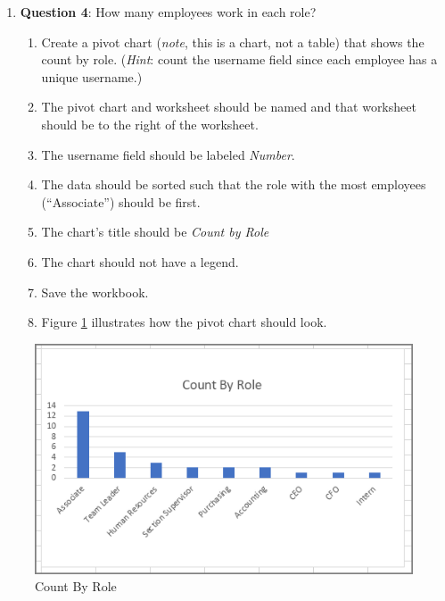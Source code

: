 \begin{enumerate}[resume]
	\item{\textbf{Question 4}: How many employees work in each role?}
	
	\begin{enumerate}
		\item Create a pivot chart (\textit{note}, this is a chart, not a table) that shows the count by role. (\textit{Hint}: count the username field since each employee has a unique username.)
		\item The pivot chart and worksheet should be named  and that worksheet should be to the right of the  worksheet.
		\item The username field should be labeled \textit{Number}.
		\item The data should be sorted such that the role with the most employees (``Associate'') should be first.
		\item The chart's title should be \textit{Count by Role}
		\item The chart should not have a legend.
		\item Save the workbook.
		\item Figure \ref{07:fig61} illustrates how the pivot chart should look.
	\end{enumerate}
	
\end{enumerate}

\begin{figure}[H]
	\centering
	\includegraphics[width=\maxwidth{.95\linewidth}]{gfx/ch07_fig61}
	\caption{Count By Role}
	\label{07:fig61}
\end{figure}

